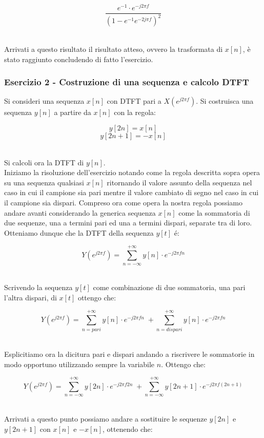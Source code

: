 \documentclass[../main.tex]{subfiles}
\begin{document}
\[ \frac{e^{-1} \cdot e^{-j2\pi f}}{(1 - e^{-1} e^{-2j\pi f})^2} \]\

Arrivati a questo risultato il risultato atteso, ovvero la trasformata di $x[n]$, è stato raggiunto concludendo di fatto l'esercizio.

\subsubsection{Esercizio 2 - Costruzione di una sequenza e calcolo DTFT}

Si consideri una sequenza $x[n]$ con DTFT pari a $X(e^{j2 \pi f})$. Si costruisca una sequenza $y[n]$ a partire da $x[n]$ con la regola:

\[ y[2n] = x[n] \]
\[ y[2n+1] = -x[n] \]\

Si calcoli ora la DTFT di $y[n]$.\\

Iniziamo la risoluzione dell'esercizio notando come la regola descritta sopra opera su una sequenza qualsiasi $x[n]$ ritornando il valore assunto della sequenza nel caso in cui il campione sia pari mentre il valore cambiato di segno nel caso in cui il campione sia dispari.
Compreso ora come opera la nostra regola possiamo andare avanti considerando la generica sequenza $x[n]$ come la sommatoria di due sequenze, una a termini pari ed una a termini dispari, separate tra di loro.\\

Otteniamo dunque che la DTFT della sequenza $y[t]$ é:

\[  Y(e^{j2\pi f}) = \sum_{n = -\infty}^{+\infty} y[n] \cdot e^{-j2\pi f n} \]\

Scrivendo la sequenza $y[t]$ come combinazione di due sommatoria, una pari l'altra dispari, di $x[t]$ ottengo che:

\[ Y(e^{j2\pi f}) = \sum_{n = \unit{pari}}^{+\infty}  y[n] \cdot e^{-j2\pi f n} \;+  \sum_{n = \unit{dispari}}^{+\infty} y[n] \cdot e^{-j2\pi f n}  \]\

Esplicitiamo ora la dicitura pari e dispari andando a riscrivere le sommatorie in modo opportuno utilizzando sempre la variabile $n$. Ottengo che:

\[ Y(e^{j2\pi f}) = \sum_{n = -\infty}^{+\infty}  y[2n] \cdot e^{-j2\pi f 2n} \;+  \sum_{n = -\infty}^{+\infty}  y[2n+1] \cdot e^{-j2\pi f (2n + 1)}  \]\

Arrivati a questo punto possiamo andare a sostituire le sequenze $y[2n]$ e $y[2n + 1]$ con $x[n]$ e $-x[n]$, ottenendo che:
\end{document}
